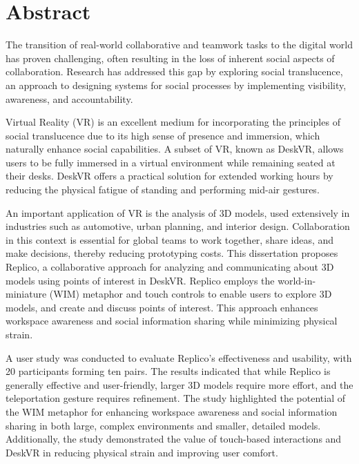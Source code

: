 

\chapter*{Abstract}

The transition of real-world collaborative and teamwork tasks to the digital world has proven challenging, often resulting in the loss of inherent social aspects of collaboration. Research has addressed this gap by exploring social translucence, an approach to designing systems for social processes by implementing visibility, awareness, and accountability.

Virtual Reality (VR) is an excellent medium for incorporating the principles of social translucence due to its high sense of presence and immersion, which naturally enhance social capabilities. A subset of VR, known as DeskVR, allows users to be fully immersed in a virtual environment while remaining seated at their desks. DeskVR offers a practical solution for extended working hours by reducing the physical fatigue of standing and performing mid-air gestures.

An important application of VR is the analysis of 3D models, used extensively in industries such as automotive, urban planning, and interior design. Collaboration in this context is essential for global teams to work together, share ideas, and make decisions, thereby reducing prototyping costs. This dissertation proposes Replico, a collaborative approach for analyzing and communicating about 3D models using points of interest in DeskVR. Replico employs the world-in-miniature (WIM) metaphor and touch controls to enable users to explore 3D models, and create and discuss points of interest. This approach enhances workspace awareness and social information sharing while minimizing physical strain.

A user study was conducted to evaluate Replico's effectiveness and usability, with 20 participants forming ten pairs. The results indicated that while Replico is generally effective and user-friendly, larger 3D models require more effort, and the teleportation gesture requires refinement. The study highlighted the potential of the WIM metaphor for enhancing workspace awareness and social information sharing in both large, complex environments and smaller, detailed models. Additionally, the study demonstrated the value of touch-based interactions and DeskVR in reducing physical strain and improving user comfort.

